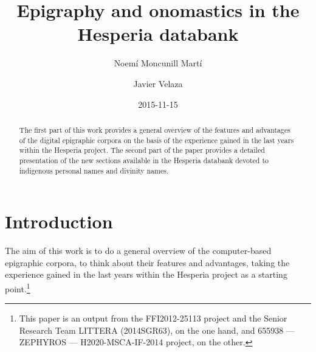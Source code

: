 \documentclass[amsthm,ebook]{saparticle}
\title{Epigraphy and onomastics in the Hesperia databank}
\author[barc]{Noemí Moncunill Martí \corref{first}}
\author[sorb]{Javier Velaza}
\date{2015-11-15}
\begin{document}
\maketitle
\begin{abstract}
The first part of this work provides a general overview of the features and advantages of the digital epigraphic corpora
on the basis of the experience gained in the last years within the Hesperia project. The second part of the paper
provides a detailed presentation of the new sections available in the Hesperia databank devoted to indigenous personal
names and divinity names.
\end{abstract}


\section{Introduction}


\noindent The aim of this work is to do a general overview of the computer-based epigraphic corpora, to think about their features
and advantages, taking the experience gained in the last years within the Hesperia project as a starting point.\footnote{ This paper is an output from the FFI2012-25113 project and the Senior Research Team LITTERA
(2014SGR63), on the one hand, and 655938 — ZEPHYROS — H2020-MSCA-IF-2014 project, on the other.}
\end{document}
